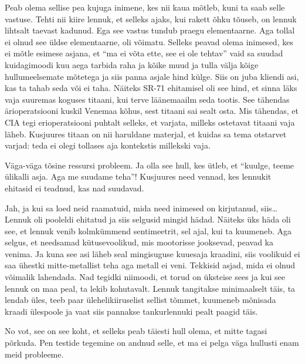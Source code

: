 Peab olema sellise pea kujuga inimene, kes nii kaua mõtleb, kuni ta saab selle 
vastuse. Tehti nii kiire lennuk, et  selleks ajaks, kui rakett õhku tõuseb, on 
lennuk lihtsalt taevast kadunud. Ega see vastus tundub praegu elementaarne. Aga 
tollal  ei olnud see üldse elementaarne,  oli võimatu. Selleks peavad olema  
inimesed, kes ei mõtle esimese asjana, et \enquote{ma ei võta ette, see ei ole 
tehtav} vaid sa suudad kuidagimoodi kuu aega tarbida raha ja kõike muud ja 
tulla välja kõige hullumeelsemate mõtetega ja siis panna asjale hind külge. 
Siis on juba kliendi asi, kas ta tahab seda või ei taha. Näiteks SR-71 
ehitamisel oli see hind, et sinna läks vaja suuremas koguses titaani, kui terve 
läänemaailm seda tootis. See tähendas ärioperatsiooni kuskil Venemaa kõhus, 
sest titaani sai sealt osta. Mis tähendas, et CIA tegi erioperatsiooni puhtalt 
selleks, et varjata, milleks ostetavat titaani vaja läheb. Kusjuures titaan on 
nii haruldane materjal, et kuidas sa tema otstarvet varjad: teda ei olegi 
tollases aja kontekstis millekski vaja. 


Väga-väga tõsine  ressursi probleem. Ja olla see hull, kes ütleb, et 
\enquote{kuulge, teeme ülikalli asja. Aga me suudame teha}! Kusjuures need 
vennad, kes lennukit ehitasid ei teadnud, kas nad suudavad. 


Jah, ja kui sa loed neid raamatuid, mida need inimesed on kirjutanud, 
siis\ldots Lennuk oli pooleldi ehitatud ja siis selgusid mingid hädad. Näiteks 
üks häda oli see, et lennuk venib kolmkümmend sentimeetrit, sel ajal, kui ta 
kuumeneb. Aga selgus, et  needsamad kütusevoolikud, mis mootorisse jooksevad, 
peavad ka venima. Ja kuna see asi läheb seal mingisuguse kuuesaja kraadini, 
siis voolikuid ei saa ühestki mitte-metallist teha aga metall ei veni. Tekkisid 
asjad, mida ei olnud võimalik lahendada. Nad tegidki niimoodi, et torud on 
üksteise sees ja kui see lennuk on maa peal, ta lekib kohutavalt. Lennuk 
tangitakse minimaalselt täis,  ta lendab üles, teeb paar ülehelikiiruselist 
sellist tõmmet, kuumeneb mõnisada kraadi ülespoole ja vaat siis pannakse 
tankurlennuki pealt paagid täis. 


No vot, see on see koht, et selleks peab täiesti hull olema, et  mitte tagasi 
põrkuda. Pen testide tegemine on andnud selle, et ma ei pelga väga hullusti 
enam meid probleeme. 

